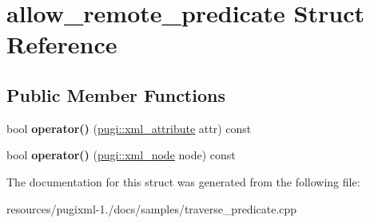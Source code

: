 \hypertarget{structallow__remote__predicate}{\section{allow\+\_\+remote\+\_\+predicate Struct Reference}
\label{structallow__remote__predicate}
}
\subsection*{Public Member Functions}
\begin{DoxyCompactItemize}
\item 
\hypertarget{structallow__remote__predicate_a5f24eb6e2fbfdc5d82d008a614e3492e}{bool {\bfseries operator()} (\hyperlink{classpugi_1_1xml__attribute}{pugi\+::xml\+\_\+attribute} attr) const }\label{structallow__remote__predicate_a5f24eb6e2fbfdc5d82d008a614e3492e}

\item 
\hypertarget{structallow__remote__predicate_aef45f29ca5ce1ff5b3d4b0b8a54628bf}{bool {\bfseries operator()} (\hyperlink{classpugi_1_1xml__node}{pugi\+::xml\+\_\+node} node) const }\label{structallow__remote__predicate_aef45f29ca5ce1ff5b3d4b0b8a54628bf}

\end{DoxyCompactItemize}


The documentation for this struct was generated from the following file\+:\begin{DoxyCompactItemize}
\item 
resources/pugixml-\/1./docs/samples/traverse\+\_\+predicate.\+cpp\end{DoxyCompactItemize}
